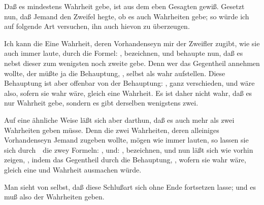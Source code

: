 \begin{aufza}
\item Daß es mindestens  Wahrheit gebe, ist aus dem eben Gesagten gewiß. Gesetzt nun, daß Jemand den Zweifel hegte, ob es auch  Wahrheiten gebe; so würde ich auf folgende Art versuchen, ihn auch hievon zu überzeugen.
\item Ich kann die Eine Wahrheit, deren Vorhandenseyn mir der Zweifler zugibt, wie sie auch immer laute, durch die Formel: , bezeichnen, und behaupte nun, daß es nebst dieser zum wenigsten noch  zweite gebe. Denn wer das Gegentheil annehmen wollte, der müßte ja die Behauptung, , selbst als wahr aufstellen. Diese Behauptung ist aber offenbar von der Behauptung: , ganz verschieden, und wäre also, sofern sie wahr wäre, gleich eine  Wahrheit. Es ist daher nicht wahr, daß es nur  Wahrheit gebe, sondern es gibt derselben wenigstens zwei.
\item Auf eine ähnliche Weise läßt sich aber darthun, daß es auch mehr als zwei Wahrheiten geben müsse. Denn die zwei Wahrheiten, deren alleiniges Vorhandenseyn Jemand zugeben wollte, mögen wie immer lauten, so lassen sie sich durch~\ die zwey Formeln: , und: , bezeichnen, und nun läßt sich wie vorhin zeigen, , indem das Gegentheil durch die Behauptung, , wofern sie wahr wäre, gleich eine  und  Wahrheit ausmachen würde.
\item  Man sieht von selbst, daß diese Schlußart sich ohne Ende fortsetzen lasse; und es muß also der Wahrheiten  geben.
\end{aufza}

